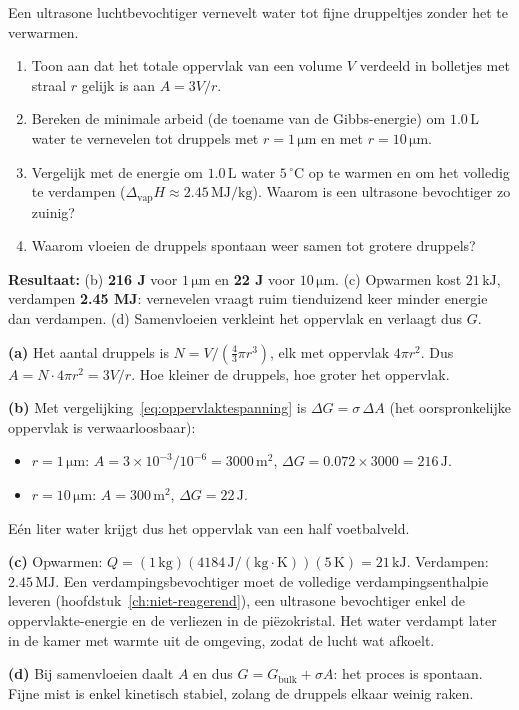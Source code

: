 \begin{oefening}\label{oef:luchtbevochtiger}
Een ultrasone luchtbevochtiger vernevelt water tot fijne druppeltjes zonder het te verwarmen.

\begin{enumerate}
\item[(a)]
  Toon aan dat het totale oppervlak van een volume \(V\) verdeeld in bolletjes met straal \(r\) gelijk is aan \(A = 3V/r\).
\item[(b)]
  Bereken de minimale arbeid (de toename van de Gibbs-energie) om \(1.0\,\mathrm{L}\) water te vernevelen tot druppels met \(r = 1\,\mathrm{\mu m}\) en met \(r = 10\,\mathrm{\mu m}\).
\item[(c)]
  Vergelijk met de energie om \(1.0\,\mathrm{L}\) water \(5\,^\circ\mathrm{C}\) op te warmen en om het volledig te verdampen (\(\Delta_{\text{vap}}H \approx 2.45\,\mathrm{MJ/kg}\)). Waarom is een ultrasone bevochtiger zo zuinig?
\item[(d)]
  Waarom vloeien de druppels spontaan weer samen tot grotere druppels?
\end{enumerate}
\end{oefening}
\begin{oplossing}
\textbf{Resultaat:} (b) \textbf{216 J} voor \(1\,\mathrm{\mu m}\) en \textbf{22 J} voor \(10\,\mathrm{\mu m}\). (c) Opwarmen kost \(21\,\mathrm{kJ}\), verdampen \textbf{2.45 MJ}: vernevelen vraagt ruim tienduizend keer minder energie dan verdampen. (d) Samenvloeien verkleint het oppervlak en verlaagt dus \(G\).

\textbf{(a)} Het aantal druppels is \(N = V/(\tfrac{4}{3}\pi r^3)\), elk met oppervlak \(4\pi r^2\). Dus \(A = N\cdot 4\pi r^2 = 3V/r\). Hoe kleiner de druppels, hoe groter het oppervlak.

\textbf{(b)} Met vergelijking~\eqref{eq:oppervlaktespanning} is \(\Delta G = \sigma\,\Delta A\) (het oorspronkelijke oppervlak is verwaarloosbaar):

\begin{itemize}
\item
  \(r = 1\,\mathrm{\mu m}\): \(A = 3\times10^{-3}/10^{-6} = 3000\,\mathrm{m^2}\), \(\Delta G = 0.072 \times 3000 = 216\,\mathrm{J}\).
\item
  \(r = 10\,\mathrm{\mu m}\): \(A = 300\,\mathrm{m^2}\), \(\Delta G = 22\,\mathrm{J}\).
\end{itemize}

Eén liter water krijgt dus het oppervlak van een half voetbalveld.

\textbf{(c)} Opwarmen: \(Q = (1\,\mathrm{kg})(4184\,\mathrm{J/(kg\cdot K)})(5\,\mathrm{K}) = 21\,\mathrm{kJ}\). Verdampen: \(2.45\,\mathrm{MJ}\). Een verdampingsbevochtiger moet de volledige verdampingsenthalpie leveren (hoofdstuk~\ref{ch:niet-reagerend}), een ultrasone bevochtiger enkel de oppervlakte-energie en de verliezen in de piëzokristal. Het water verdampt later in de kamer met warmte uit de omgeving, zodat de lucht wat afkoelt.

\textbf{(d)} Bij samenvloeien daalt \(A\) en dus \(G = G_{\text{bulk}} + \sigma A\): het proces is spontaan. Fijne mist is enkel kinetisch stabiel, zolang de druppels elkaar weinig raken.
\end{oplossing}

